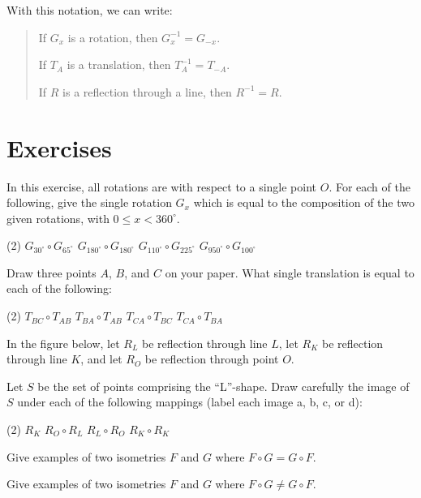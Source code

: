 \documentclass[12pt]{book} %
\begin{document}
\begin{ExerciseList}
With this notation, we can write:
\begin{quote}
If $G_x$ is a rotation, then $G_x^{-1}=G_{-x}$.

If $T_A$ is a translation, then $T_A^{-1}=T_{-A}$.

If $R$ is a reflection through a line, then $R^{-1}=R$.
\end{quote}

\section*{Exercises}

\setcounter{Exercise}{0}
\begin{ExerciseList}
\Exercise In this exercise, all rotations are with respect to a single point $O$. For each of the following, give the single rotation $G_x$ which is equal to the composition of the two given rotations, with $0\le x<360^\circ$.
\begin{tasks}(2)
\task[(a)] $G_{30^\circ}\circ G_{65^\circ}$
\task[(b)] $G_{180^\circ}\circ G_{180^\circ}$
\task[(c)] $G_{110^\circ}\circ G_{225^\circ}$
\task[(d)] $G_{950^\circ}\circ G_{100^\circ}$
\end{tasks}

\Exercise Draw three points $A$, $B$, and $C$ on your paper. What single translation is equal to each of the following:
\begin{tasks}(2)
\task[(a)] $T_{BC}\circ T_{AB}$
\task[(b)] $T_{BA}\circ T_{AB}$
\task[(c)] $T_{CA}\circ T_{BC}$
\task[(d)] $T_{CA}\circ T_{BA}$
\end{tasks}

\Exercise In the figure below, let $R_L$ be reflection through line $L$, let $R_K$ be reflection through line $K$, and let $R_O$ be reflection through point $O$.


Let $S$ be the set of points comprising the ``L''-shape. Draw carefully the image of $S$ under each of the following mappings (label each image a, b, c, or d):
\begin{tasks}(2)
\task[(a)] $R_K$
\task[(b)] $R_O\circ R_L$
\task[(c)] $R_L\circ R_O$
\task[(d)] $R_K\circ R_K$
\end{tasks}

\Exercise Give examples of two isometries $F$ and $G$ where $F\circ G=G\circ F$.

\Exercise Give examples of two isometries $F$ and $G$ where $F\circ G\ne G\circ F$.


\end{ExerciseList}
\end{ExerciseList}
\end{document}
